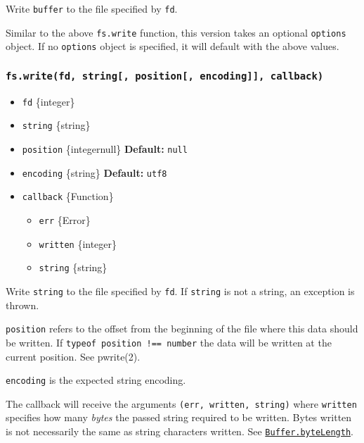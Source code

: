Write \texttt{buffer} to the file specified by \texttt{fd}.

Similar to the above \texttt{fs.write} function, this version takes an
optional \texttt{options} object. If no \texttt{options} object is
specified, it will default with the above values.

\subsubsection{\texorpdfstring{\texttt{fs.write(fd,\ string{[},\ position{[},\ encoding{]}{]},\ callback)}}{fs.write(fd, string{[}, position{[}, encoding{]}{]}, callback)}}\label{fs.writefd-string-position-encoding-callback}

\begin{itemize}
\tightlist
\item
  \texttt{fd} \{integer\}
\item
  \texttt{string} \{string\}
\item
  \texttt{position} \{integer\textbar null\} \textbf{Default:}
  \texttt{null}
\item
  \texttt{encoding} \{string\} \textbf{Default:}
  \texttt{\textquotesingle{}utf8\textquotesingle{}}
\item
  \texttt{callback} \{Function\}

  \begin{itemize}
  \tightlist
  \item
    \texttt{err} \{Error\}
  \item
    \texttt{written} \{integer\}
  \item
    \texttt{string} \{string\}
  \end{itemize}
\end{itemize}

Write \texttt{string} to the file specified by \texttt{fd}. If
\texttt{string} is not a string, an exception is thrown.

\texttt{position} refers to the offset from the beginning of the file
where this data should be written. If
\texttt{typeof\ position\ !==\ \textquotesingle{}number\textquotesingle{}}
the data will be written at the current position. See pwrite(2).

\texttt{encoding} is the expected string encoding.

The callback will receive the arguments
\texttt{(err,\ written,\ string)} where \texttt{written} specifies how
many \emph{bytes} the passed string required to be written. Bytes
written is not necessarily the same as string characters written. See
\href{buffer.md\#static-method-bufferbytelengthstring-encoding}{\texttt{Buffer.byteLength}}.

